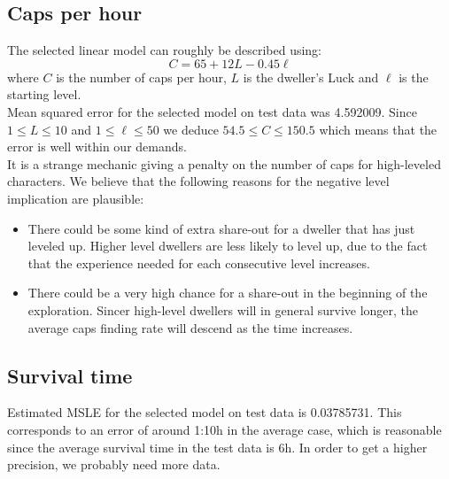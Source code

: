 \subsection{Caps per hour}
The selected linear model can roughly be described using:
\begin{equation}
C=65+12L-0.45\ell
\end{equation}
where $C$ is the number of caps per hour, $L$ is the dweller's Luck and $\ell$ is the starting level.\\

Mean squared error for the selected model on test data was 4.592009. Since $1\leq L\leq 10$ and $1\leq\ell\leq50$ we deduce $54.5\leq C\leq 150.5$ which means that the error is well within our demands.\\

It is a strange mechanic giving a penalty on the number of caps for high-leveled characters. We believe that the following reasons for the negative level implication are plausible:
\begin{itemize}
\item There could be some kind of extra share-out for a dweller that has just leveled up. Higher level dwellers are less likely to level up, due to the fact that the experience needed for each consecutive level increases.
\item There could be a very high chance for a share-out in the beginning of the exploration. Sincer high-level dwellers will in general survive longer, the average caps finding rate will descend as the time increases. 
\end{itemize}

\subsection{Survival time}
Estimated MSLE for the selected model on test data is 0.03785731. This corresponds to an error of around 1:10h in the average case, which is reasonable since the average survival time in the test data is 6h. In order to get a higher precision, we probably need more data.